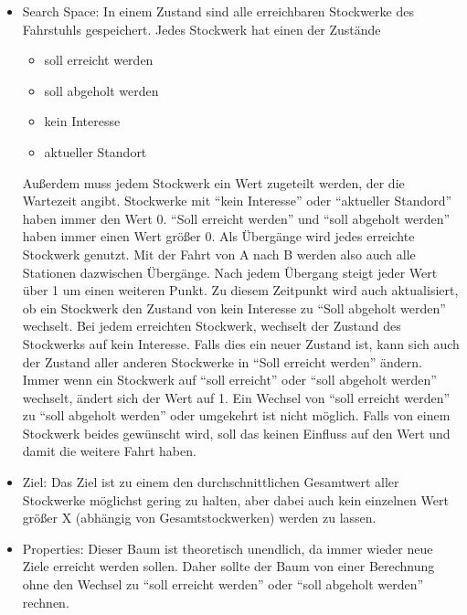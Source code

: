 \documentclass[ngerman]{fbi-aufgabenblatt}
\begin{document}
\begin{itemize}
    \item Search Space: In einem Zustand sind alle erreichbaren Stockwerke des Fahrstuhls gespeichert. Jedes Stockwerk hat einen der Zustände

\begin{itemize}
    
    \item soll erreicht werden
    
    \item soll abgeholt werden
    
    \item kein Interesse
    
    \item aktueller Standort
    
    \end{itemize}
    
    Außerdem muss jedem Stockwerk ein Wert zugeteilt werden, der die Wartezeit angibt. Stockwerke mit “kein Interesse” oder “aktueller Standord” haben immer den Wert 0. “Soll erreicht werden” und “soll abgeholt werden” haben immer einen Wert größer 0.
Als Übergänge wird jedes erreichte Stockwerk genutzt. Mit der Fahrt von A nach B werden also auch alle Stationen dazwischen Übergänge. Nach jedem Übergang steigt jeder Wert über 1 um einen weiteren Punkt. Zu diesem Zeitpunkt wird auch aktualisiert, ob ein Stockwerk den Zustand von kein Interesse zu “Soll abgeholt werden” wechselt. Bei jedem erreichten Stockwerk, wechselt der Zustand des Stockwerks auf kein Interesse. Falls dies ein neuer Zustand ist, kann sich auch der Zustand aller anderen Stockwerke in “Soll erreicht werden” ändern.
Immer wenn ein Stockwerk auf “soll erreicht” oder “soll abgeholt werden” wechselt, ändert sich der Wert auf 1. 
Ein Wechsel von “soll erreicht werden” zu “soll abgeholt werden” oder umgekehrt ist nicht möglich. Falls von einem Stockwerk beides gewünscht wird, soll das keinen Einfluss auf den Wert und damit die weitere Fahrt haben.

    
    \item Ziel: Das Ziel ist zu einem den durchschnittlichen Gesamtwert aller Stockwerke möglichst gering zu halten, aber dabei auch kein einzelnen Wert größer X (abhängig von Gesamtstockwerken) werden zu lassen.


    \item Properties: Dieser Baum ist theoretisch unendlich, da immer wieder neue Ziele erreicht werden sollen. Daher sollte der Baum von einer Berechnung ohne den Wechsel zu “soll erreicht werden” oder “soll abgeholt werden” rechnen. 


\end{itemize}
\end{document}
